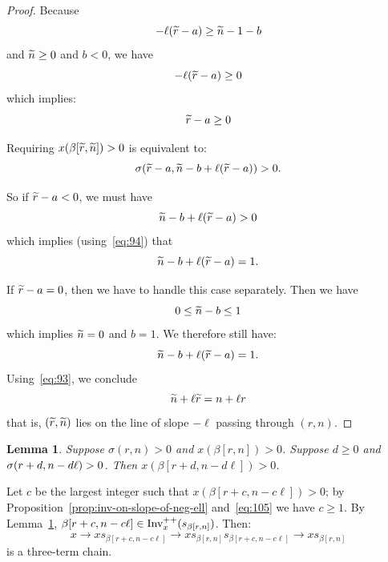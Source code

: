 \documentclass[10pt]{amsart}
\newtheorem{lemm}[theo]{Lemma}
\begin{document}
\begin{proof}
Because
\begin{equation}\label{eq:96}
- \ell (\tr -a) \geq \tn -1 - b
\end{equation}
and $\widetilde{n} \geq 0$ and $b < 0$, we have
\begin{equation}\label{eq:97}
- \ell (\tr -a) \geq 0
\end{equation}
which implies:
\begin{equation}\label{eq:98}
\tr -a \geq 0
\end{equation}

Requiring $x(\beta[\widetilde{r},\widetilde{n}]) >0$ is equivalent to:
\begin{equation}\label{eq:99}
\sigma(\tr-a, \tn - b + \ell (\tr -a)) >0.
\end{equation}

So if $\widetilde{r} -a < 0$, we must have
\begin{equation}\label{eq:100}
\tn - b + \ell (\tr -a) > 0
\end{equation}
which implies (using~\eqref{eq:94}) that
\begin{equation}\label{eq:101}
\tn - b + \ell (\tr -a) = 1.
\end{equation}

If $\widetilde{r} -a = 0$, then we have to handle this case separately. Then we have
\begin{equation}\label{eq:102}
0 \leq \tn - b \leq 1
\end{equation}
which implies $\widetilde{n} = 0$ and $b = 1$. We therefore still have:
\begin{equation}\label{eq:103}
\tn - b +\ell (\tr -a) = 1.
\end{equation}
Using~\eqref{eq:93}, we conclude
\begin{equation}\label{eq:50}
\tn + \ell \tr = n + \ell r
\end{equation}
that is, $(\widetilde{r},\widetilde{n})$ lies on the line of slope $-\ell$ passing through $(r,n)$.
\end{proof}

\begin{lemm}\label{lem:shift-by-ell}
Suppose $\sigma(r,n) >0$ and $x(\beta[r,n]) > 0$. Suppose $d \geq 0$ and $\sigma(r+d,\linebreak n-d\ell)>0$. Then $ x(\beta[r+d,n-d\ell]) > 0 $.
\end{lemm}

Let $c$ be the largest integer such that $x(\beta[r+c,n-c\ell]) > 0$; by Proposition~\ref{prop:inv-on-slope-of-neg-ell} and~\eqref{eq:105} we have $c \geq 1$. By Lemma~\ref{lem:shift-by-ell}, $\beta[r+c,n-c\ell] \in \operatorname{Inv}^{++}_x(s_{\beta[r,n]})$. Then:
\begin{equation}\label{eq:83}
x \rightarrow x s_{\beta[r+c, n- c\ell]} \rightarrow x s_{\beta[r,n]} s_{\beta[r+c, n- c\ell]}
\rightarrow x s_{\beta[r,n]}
\end{equation}
is a three-term chain.
\end{document}
